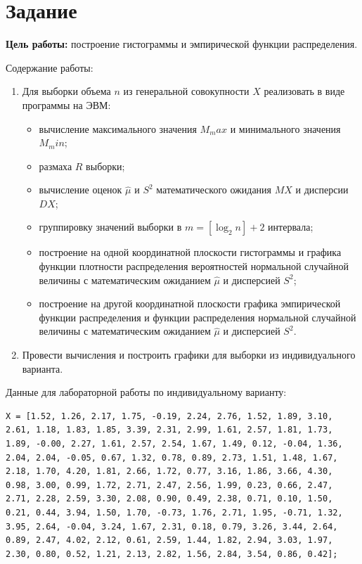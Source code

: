 \setcounter{page}{3}

\chapter{Задание}

\textbf{Цель работы:} построение гистограммы и эмпирической функции распределения.

Содержание работы:
\begin{enumerate}
	\item Для выборки объема $n$ из генеральной совокупности $X$ реализовать в виде программы на ЭВМ: \begin{itemize}
		\item вычисление максимального значения $M_max$ и минимального значения $M_min$;
		\item размаха $R$ выборки;
		\item вычисление оценок $\hat{\mu}$ и $S^2$ математического ожидания $MX$ и дисперсии $DX$;
		\item группировку значений выборки в $m = [\log_2{n}] + 2$ интервала;
		\item построение на одной координатной плоскости гистограммы и графика функции плотности распределения вероятностей нормальной случайной величины с математическим ожиданием $\hat{\mu}$ и дисперсией $S^2$;
		\item построение на другой координатной плоскости графика эмпирической функции распределения и функции распределения нормальной случайной величины с математическим ожиданием $\hat{\mu}$ и дисперсией $S^2$.
	\end{itemize}
	\item Провести вычисления и построить графики для выборки из индивидуального варианта.
\end{enumerate} 

Данные для лабораторной работы по индивидуальному варианту:

\begin{lstlisting}[]
X = [1.52, 1.26, 2.17, 1.75, -0.19, 2.24, 2.76, 1.52, 1.89, 3.10, 2.61, 1.18, 1.83, 1.85, 3.39, 2.31, 2.99, 1.61, 2.57, 1.81, 1.73, 1.89, -0.00, 2.27, 1.61, 2.57, 2.54, 1.67, 1.49, 0.12, -0.04, 1.36, 2.04, 2.04, -0.05, 0.67, 1.32, 0.78, 0.89, 2.73, 1.51, 1.48, 1.67, 2.18, 1.70, 4.20, 1.81, 2.66, 1.72, 0.77, 3.16, 1.86, 3.66, 4.30, 0.98, 3.00, 0.99, 1.72, 2.71, 2.47, 2.56, 1.99, 0.23, 0.66, 2.47, 2.71, 2.28, 2.59, 3.30, 2.08, 0.90, 0.49, 2.38, 0.71, 0.10, 1.50, 0.21, 0.44, 3.94, 1.50, 1.70, -0.73, 1.76, 2.71, 1.95, -0.71, 1.32, 3.95, 2.64, -0.04, 3.24, 1.67, 2.31, 0.18, 0.79, 3.26, 3.44, 2.64, 0.89, 2.47, 4.02, 2.12, 0.61, 2.59, 1.44, 1.82, 2.94, 3.03, 1.97, 2.30, 0.80, 0.52, 1.21, 2.13, 2.82, 1.56, 2.84, 3.54, 0.86, 0.42];
\end{lstlisting}

